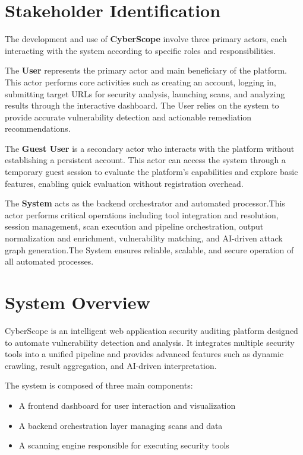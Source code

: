


\section{Stakeholder Identification}

\indent The development and use of \textbf{CyberScope} involve three primary actors, each interacting with the system according to specific roles and responsibilities.

\indent The \textbf{User} represents the primary actor and main beneficiary of the platform. This actor performs core activities such as creating an account, logging in, submitting target URLs for security analysis, launching scans, and analyzing results through the interactive dashboard. The User relies on the system to provide accurate vulnerability detection and actionable remediation recommendations.

\indent The \textbf{Guest User} is a secondary actor who interacts with the platform without establishing a persistent account. This actor can access the system through a temporary guest session to evaluate the platform's capabilities and explore basic features, enabling quick evaluation without registration overhead.

\indent The \textbf{System} acts as the backend orchestrator and automated processor.This actor performs critical operations including tool integration and resolution, session management, scan execution and pipeline orchestration, output normalization and enrichment, vulnerability matching, and AI-driven attack graph generation.The System ensures reliable, scalable, and secure operation of all automated processes.
\break
\section{System Overview}

\indent\justifying CyberScope is an intelligent web application security auditing platform designed to automate vulnerability detection and analysis. It integrates multiple security tools into a unified pipeline and provides advanced features such as dynamic crawling, result aggregation, and AI-driven interpretation.

\indent The system is composed of three main components:

\begin{itemize}
    \item A frontend dashboard for user interaction and visualization
    \item A backend orchestration layer managing scans and data
    \item A scanning engine responsible for executing security tools
\end{itemize}

